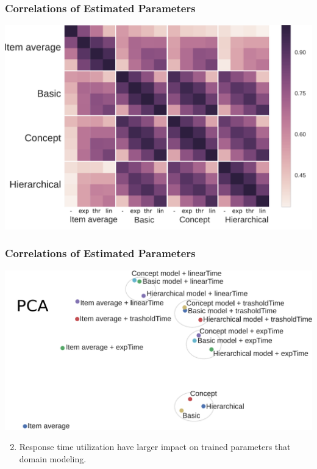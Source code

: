 \documentclass[xcolor=svgnames]{beamer}
\begin{document}
\begin{frame}
    \frametitle{Correlations of Estimated Parameters}
    \includegraphics[width=\linewidth]{figures/difficulty-correlations}
\end{frame}
\begin{frame}
    \frametitle{Correlations of Estimated Parameters}
    \includegraphics[width=\linewidth]{figures/pca}
    \begin{enumerate}
        \setcounter{enumi}{1}
        \item Response time utilization have larger impact on trained parameters that domain modeling.
    \end{enumerate}
\end{frame}
\end{document}
